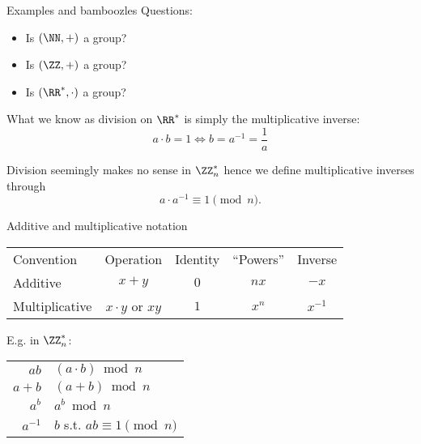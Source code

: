 \begin{frame}{Examples and bamboozles}
  Questions:
  \begin{itemize}[<+(1)->]
    \item Is $(\NN, +)$ a group?
    \item Is $(\ZZ, +)$ a group?
    \item Is $(\RR^*, \cdot)$ a group?
  \end{itemize}

  \pause
  What we know as division on $\RR^*$ is simply the multiplicative inverse:
  \[
    a \cdot b = 1 \iff b = a^{-1} = \frac{1}{a}
  \]

  \pause
  Division seemingly makes no sense in $\ZZ_n^*$ hence we define multiplicative inverses through
  \[
    a\cdot a^{-1} \equiv 1 \pmod{n}.
  \]
\end{frame}

\begin{frame}{Additive and multiplicative notation}
  \begin{center}
  \begin{tabular}{@{}l c c c c@{}}
    \toprule
    Convention & Operation & Identity & \enquote{Powers} & Inverse\\
    \cmidrule{1-5}
    Additive & $x + y$ & $0$ & $nx$ & $-x$\\
    \cmidrule{1-5}
    Multiplicative & $x\cdot y$ or $xy$ & $1$ & $x^n$ & $x^{-1}$\\
    \bottomrule
  \end{tabular}
  \end{center}

  \pause
  E.g. in $\ZZ_n^*$:

  \begin{tabular}{r l}
    \pause $ab$     & $(a \cdot b) \bmod{n}$\\
    \pause $a+b$    & $(a + b) \bmod{n}$\\
    \pause $a^b$    & $a^b \bmod{n}$\\
    \pause $a^{-1}$ & $b$ s.t. $ab \equiv 1 \pmod{n}$
  \end{tabular}
\end{frame}

